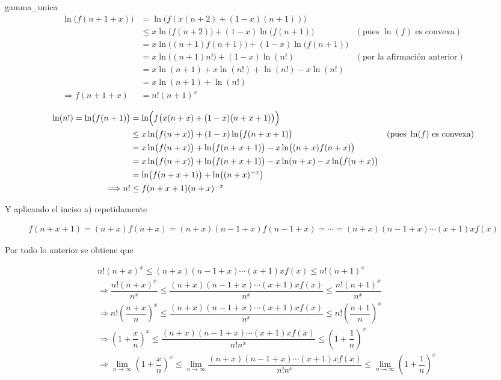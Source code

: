 \documentclass[fleqn]{article}
\newcounter{teore}
\newenvironment{teorema}[2]{\begin{teo}[breakable, pad at break = 5mm, leftrule = 0.7mm, rightrule = 0.7mm, right = 2mm, left = 2mm, enlarge bottom finally by = 3mm, fontupper = \setlength{\parskip}{2mm}, fontlower = \setlength{\parskip}{2mm}]{#1}{#2}}{\end{teo}}
\begin{document}
\begin{teorema}{}{gamma_unica}
		\begin{align*}
			\ln \bigl( f(n + 1 + x) \bigr) &= \ln \bigl( f(x(n+2) + (1-x)(n+1)) \bigr) & \\
			&\leq x \ln \bigl( f(n + 2) \bigr) + (1-x) \ln \bigl( f(n + 1) \bigr) & (\mbox{pues } \ln(f) \mbox{ es convexa}) \\
			&= x \ln \bigl( (n+1) f(n + 1) \bigr) + (1-x) \ln \bigl( f(n + 1) \bigr) & \\
			&= x \ln \bigl( (n+1) n! \bigr) + (1-x) \ln (n!) & (\mbox{por la afirmación anterior}) \\
			&= x \ln (n+1) + x \ln (n!) + \ln (n!) - x\ln (n!) & \\
			&= x \ln (n+1) + \ln (n!) & \\
			\Longrightarrow f(n + 1 + x) &= n! (n+1)^x & 
		\end{align*}
		
		\begin{align*}
			\ln (n!) = \ln \bigl( f(n+1) \bigr) &= \ln \Bigl( f \bigl( x(n+x) + (1-x)(n+x+1) \bigr) \Bigr) \\
			&\leq x \ln \bigl( f (n+x) \bigr) + (1-x) \ln \bigl( f (n+x+1) \bigr) & (\mbox{pues } \ln(f) \mbox{ es convexa}) \\
			&= x \ln \bigl( f (n+x) \bigr) + \ln \bigl( f (n+x+1) \bigr) - x \ln \bigl( (n+x) f(n+x) \bigr) \\
			&= x \ln \bigl( f (n+x) \bigr) + \ln \bigl( f (n+x+1) \bigr) - x \ln(n+x) - x \ln \bigl( f(n+x) \bigr) \\
			&= \ln \bigl( f (n+x+1) \bigr) + \ln \bigl( (n+x)^{-x} \bigr) \\
			\Longrightarrow n! &\leq f (n+x+1) (n+x)^{-x}
		\end{align*}

		Y aplicando el inciso a) repetidamente

		\begin{align*}
			f(n+x+1) = (n+x) f(n+x) = (n+x)(n-1+x) f(n-1+x) = \cdots = (n+x)(n-1+x) \cdots (x+1)x f(x)
		\end{align*}

		Por todo lo anterior se obtiene que

		\begin{align*}
			& n! (n+x)^x \leq (n+x)(n-1+x) \cdots (x+1)x f(x) \leq n! (n+1)^x \\
			& \Longrightarrow \dfrac{n! (n+x)^x}{n^x} \leq \dfrac{(n+x)(n-1+x) \cdots (x+1)x f(x)}{n^x} \leq \dfrac{n! (n+1)^x}{n^x} \\
			& \Longrightarrow n! \left( \dfrac{n+x}{n} \right)^x \leq \dfrac{(n+x)(n-1+x) \cdots (x+1)x f(x)}{n^x} \leq n! \left( \dfrac{n+1}{n} \right)^x \\
			& \Longrightarrow \left( 1 + \dfrac{x}{n} \right)^x \leq \dfrac{(n+x)(n-1+x) \cdots (x+1)x f(x)}{n! n^x} \leq \left( 1 + \dfrac{1}{n} \right)^x \\
			& \Longrightarrow \lim_{n \to \infty} \left( 1 + \dfrac{x}{n} \right)^x \leq \lim_{n \to \infty} \dfrac{(n+x)(n-1+x) \cdots (x+1)x f(x)}{n! n^x} \leq \lim_{n \to \infty} \left( 1 + \dfrac{1}{n} \right)^x
		\end{align*}	


\end{teorema}
\end{document}
